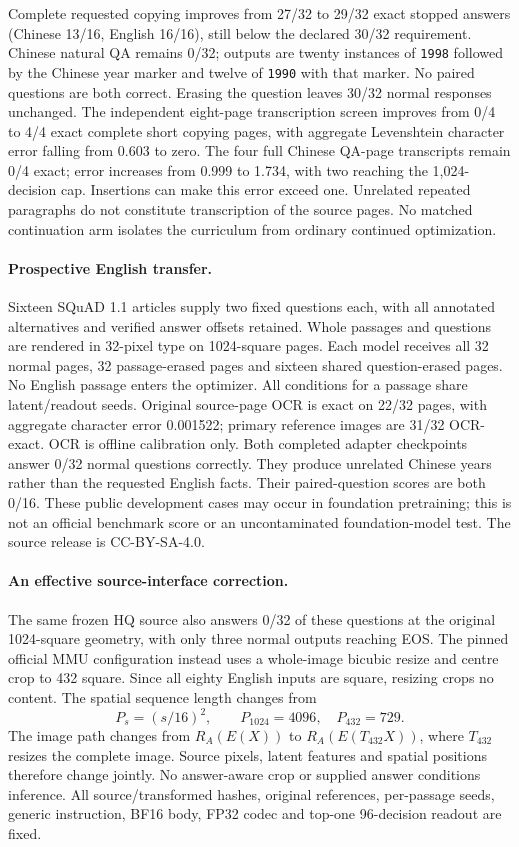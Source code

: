 \documentclass[10pt,a4paper]{article}
\begin{document}
Complete requested copying improves from 27/32 to 29/32 exact stopped answers
(Chinese 13/16, English 16/16), still below the declared 30/32 requirement.
Chinese natural QA remains 0/32; outputs are twenty instances of
\texttt{1998} followed by the Chinese year marker and twelve of \texttt{1990}
with that marker. No paired questions are both correct. Erasing the question
leaves 30/32 normal responses unchanged. The independent eight-page
transcription screen improves from 0/4 to 4/4 exact complete short copying
pages, with aggregate Levenshtein character error falling from 0.603 to zero.
The four full Chinese QA-page transcripts remain 0/4 exact; error increases
from 0.999 to 1.734, with two reaching the 1,024-decision cap. Insertions can
make this error exceed one. Unrelated repeated paragraphs do not constitute
transcription of the source pages. No matched continuation arm isolates the
curriculum from ordinary continued optimization.

\paragraph{Prospective English transfer.}
Sixteen SQuAD 1.1 articles\cite{squad} supply two fixed questions each, with
all annotated alternatives and verified answer offsets retained. Whole
passages and questions are rendered in 32-pixel type on 1024-square pages.
Each model receives all 32 normal pages, 32 passage-erased pages and sixteen
shared question-erased pages. No English passage enters the optimizer.
All conditions for a passage share latent/readout seeds. Original source-page
OCR is exact on 22/32 pages, with aggregate character error 0.001522; primary
reference images are 31/32 OCR-exact. OCR is offline calibration only.
Both completed adapter checkpoints answer 0/32 normal questions correctly.
They produce unrelated Chinese years rather than the requested English facts.
Their paired-question scores are both 0/16. These public development cases
may occur in foundation pretraining; this is not an official benchmark score
or an uncontaminated foundation-model test. The source release is CC-BY-SA-4.0.

\paragraph{An effective source-interface correction.}
The same frozen HQ source also answers 0/32 of these questions at the original
1024-square geometry, with only three normal outputs reaching EOS. The
pinned official MMU configuration instead uses a whole-image bicubic resize
and centre crop to 432 square. Since all eighty English inputs are square,
resizing crops no content. The spatial sequence length changes from
\[
 P_s=(s/16)^2,\qquad P_{1024}=4096,\quad P_{432}=729.
\]
The image path changes from $R_A(E(X))$ to $R_A(E(T_{432}X))$, where
$T_{432}$ resizes the complete image. Source pixels, latent features and
spatial positions therefore change jointly. No answer-aware crop or supplied
answer conditions inference. All source/transformed hashes, original
references, per-passage seeds, generic instruction, BF16 body, FP32 codec
and top-one 96-decision readout are fixed.
\end{document}
